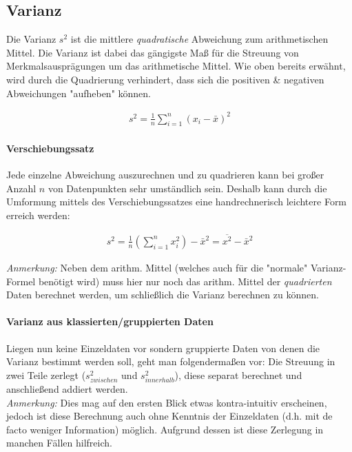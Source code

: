 \documentclass[a4paper]{article}
\begin{document}
\noindent {}

\subsection{Varianz}\label{sec:Varianz}
Die Varianz $s^2$ ist die mittlere \textit{quadratische} Abweichung zum arithmetischen Mittel. Die Varianz ist dabei das gängigste Maß für die Streuung von Merkmalsausprägungen um das arithmetische Mittel. Wie oben bereits erwähnt, wird durch die Quadrierung verhindert, dass sich die positiven \& negativen Abweichungen "aufheben" können.

\begin{align*}
    s^2 = \frac{1}{n} \sum_{i=1}^n (x_i-\bar{x})^2
\end{align*}

\paragraph{Verschiebungssatz} Jede einzelne Abweichung auszurechnen und zu quadrieren kann bei großer Anzahl $n$ von Datenpunkten sehr umständlich sein. Deshalb kann durch die Umformung mittels des Verschiebungssatzes eine handrechnerisch leichtere Form erreich werden:

\begin{align*}
    s^2 = \frac{1}{n} (\sum_{i=1}^n x^2_i)-\bar{x}^2 = \overline{x^2} - \bar{x}^2
\end{align*}

\noindent \textit{Anmerkung:} Neben dem arithm. Mittel (welches auch für die "normale" Varianz-Formel benötigt wird) muss hier nur noch das arithm. Mittel der \textit{quadrierten} Daten berechnet werden, um schließlich die Varianz berechnen zu können.

\paragraph{Varianz aus klassierten/gruppierten Daten} Liegen nun keine Einzeldaten vor sondern gruppierte Daten von denen die Varianz bestimmt werden soll, geht man folgendermaßen vor:
Die Streuung in zwei Teile zerlegt ($s^2_{zwischen}$ und $s^2_{innerhalb}$), diese separat berechnet und anschließend addiert werden.\\
\textit{Anmerkung:} Dies mag auf den ersten Blick etwas kontra-intuitiv erscheinen, jedoch ist diese Berechnung auch ohne Kenntnis der Einzeldaten (d.h. mit de facto weniger Information) möglich. Aufgrund dessen ist diese Zerlegung in manchen Fällen hilfreich.\\
\end{document}
